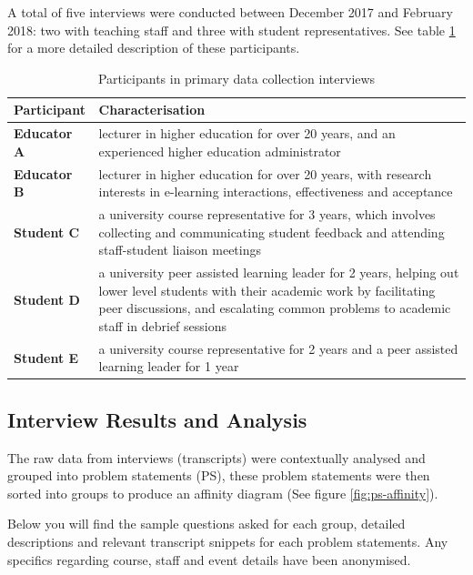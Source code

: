 A total of five interviews were conducted between December 2017 and February 2018: 
two with teaching staff and three with student representatives. See table 
\ref{table:participants-req} for a more detailed description of these participants.

\begin{table}[!h] 
    \caption{Participants in primary data collection interviews}
    \centering
    \label{table:participants-req}
    \begin{tabularx}{\textwidth}{>{\bfseries}lX}
        Participant & Characterisation\\
        \toprule
        Educator A & lecturer in higher education for over 20 years, and an experienced higher education 
        administrator\\\midrule
        Educator B & lecturer in higher education for over 20 years, with research interests 
        in e-learning interactions, effectiveness and acceptance\\\midrule
        Student C & a university course representative for 3 years, which involves collecting and 
        communicating student feedback and attending staff-student liaison meetings \\\midrule
        Student D & a university peer assisted learning leader for 2 years, helping out lower level 
        students with their academic work by facilitating peer discussions, and escalating common problems
        to academic staff in debrief sessions\\\midrule
        Student E & a university course representative for 2 years and a peer assisted learning leader 
        for 1 year\\\bottomrule
    \end{tabularx}
\end{table}

\subsection{Interview Results and Analysis}

The raw data from interviews (transcripts) were contextually analysed and grouped into problem statements (PS), 
these problem statements were then sorted into groups to produce an affinity diagram (See figure 
\ref{fig:ps-affinity}).

Below you will find the sample questions asked for each group, detailed descriptions and relevant transcript 
snippets for each problem statements. 
Any specifics regarding course, staff and event details have been anonymised.

